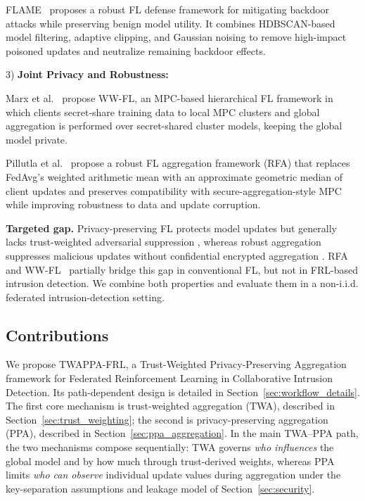 \documentclass[journal]{IEEEtran}
\begin{document}
FLAME~\cite{nguyen_flame_2022} proposes a robust FL defense framework for
mitigating backdoor attacks while preserving benign model utility. It combines
HDBSCAN-based model filtering, adaptive clipping, and Gaussian noising to remove
high-impact poisoned updates and neutralize remaining backdoor effects. 

3) \noindent\textbf{Joint Privacy and Robustness:}

Marx et al.~\cite{marx2026wwfl} propose WW-FL, an MPC-based hierarchical FL
framework in which clients secret-share training data to local MPC clusters and
global aggregation is performed over secret-shared cluster models, keeping the
global model private. 

Pillutla et al.~\cite{pillutla_robust_2022} propose a robust FL aggregation framework
(RFA) that replaces FedAvg's weighted arithmetic mean with an approximate geometric
median of client updates and preserves compatibility with secure-aggregation-style
MPC while improving robustness to data and update corruption. 

\textbf{Targeted gap.}
Privacy-preserving FL protects model updates but generally lacks
trust-weighted adversarial suppression
\cite{bonawitz2017secagg,zhang2020batchcrypt,manh2024homomorphic,
savposeidon2021,xuhercules2023}, whereas robust aggregation suppresses malicious
updates without confidential encrypted aggregation
\cite{cao2021fltrust,fung_limitations_2020,zhang_fldetector_2022,
nguyen_flame_2022}. RFA~\cite{pillutla_robust_2022} and
WW-FL~\cite{marx2026wwfl} partially bridge this gap in conventional FL, but
not in FRL-based intrusion detection. We combine both properties and evaluate them
in a non-i.i.d. federated intrusion-detection setting.

\subsection{Contributions}
We propose TWAPPA-FRL, a Trust-Weighted Privacy-Preserving Aggregation
framework for Federated Reinforcement Learning in Collaborative Intrusion
Detection. Its path-dependent design is detailed in
Section~\ref{sec:workflow_details}. The first core mechanism is trust-weighted
aggregation (TWA), described in Section~\ref{sec:trust_weighting}; the second is
privacy-preserving aggregation (PPA), described in
Section~\ref{sec:ppa_aggregation}. In the main TWA--PPA path, the two mechanisms
compose sequentially: TWA governs \emph{who influences} the global model and by how
much through trust-derived weights, whereas PPA limits \emph{who can observe}
individual update values during aggregation under the key-separation
assumptions and leakage model of Section~\ref{sec:security}.
\end{document}
